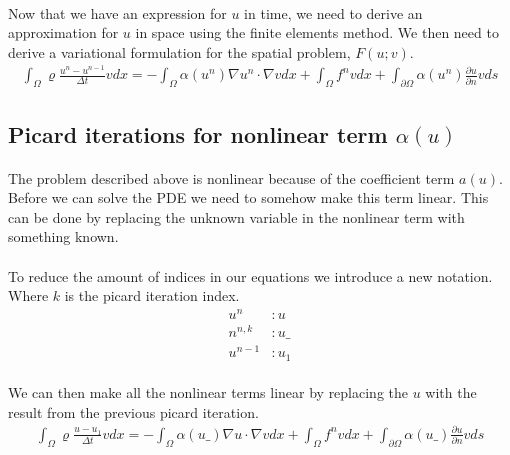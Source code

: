 \documentclass[11pt,a4paper]{article}
\begin{document}
\paragraph*{}
Now that we have an expression for $u$ in time, we need to derive an approximation for $u$ in space using the finite elements method. We then need to derive a variational formulation for the spatial problem,  $F(u;v)$.
\begin{align}
\int_\Omega \varrho\frac{u^n-u^{n-1}}{\Delta t}vdx = -\int_\Omega\alpha(u^n)\nabla u^n \cdot \nabla v dx + \int_\Omega f^n v dx + \int_{\partial\Omega} \alpha(u^{n})\frac{\partial u}{\partial n}vds
\end{align}
\subsection{Picard iterations for nonlinear term $\alpha(u)$}
\paragraph*{}
The problem described above is nonlinear because of the coefficient term $a(u)$. Before we can solve the PDE we need to somehow make this term linear. This can be done by replacing the unknown variable in the nonlinear term with something known.
\paragraph*{}
To reduce the amount of indices in our equations we introduce a new notation. Where $k$ is the picard iteration index.
\begin{align*}
u^n &: u \\
n^{n,k} &: u\_ \\
u^{n-1} &: u_1
\end{align*}
\paragraph*{}
We can then make all the nonlinear terms linear by replacing the $u$ with the result from the previous picard iteration.
\begin{align}
\int_\Omega \varrho\frac{u-u_1}{\Delta t}vdx = -\int_\Omega\alpha(u\_)\nabla u \cdot \nabla v dx + \int_\Omega f^n v dx + \int_{\partial\Omega} \alpha(u\_)\frac{\partial u}{\partial n}vds
\end{align}
\end{document}
